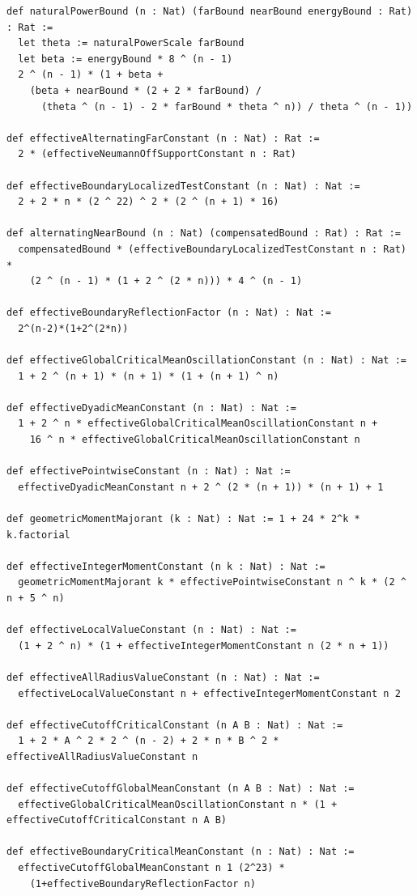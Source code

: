 \documentclass[reqno,11pt]{amsart}
\numberwithin{equation}{section}
\theoremstyle{definition}
\theoremstyle{remark}
\begin{document}
\begin{lstlisting}
def naturalPowerBound (n : Nat) (farBound nearBound energyBound : Rat) : Rat :=
  let theta := naturalPowerScale farBound
  let beta := energyBound * 8 ^ (n - 1)
  2 ^ (n - 1) * (1 + beta +
    (beta + nearBound * (2 + 2 * farBound) /
      (theta ^ (n - 1) - 2 * farBound * theta ^ n)) / theta ^ (n - 1))

def effectiveAlternatingFarConstant (n : Nat) : Rat :=
  2 * (effectiveNeumannOffSupportConstant n : Rat)

def effectiveBoundaryLocalizedTestConstant (n : Nat) : Nat :=
  2 + 2 * n * (2 ^ 22) ^ 2 * (2 ^ (n + 1) * 16)

def alternatingNearBound (n : Nat) (compensatedBound : Rat) : Rat :=
  compensatedBound * (effectiveBoundaryLocalizedTestConstant n : Rat) *
    (2 ^ (n - 1) * (1 + 2 ^ (2 * n))) * 4 ^ (n - 1)

def effectiveBoundaryReflectionFactor (n : Nat) : Nat :=
  2^(n-2)*(1+2^(2*n))

def effectiveGlobalCriticalMeanOscillationConstant (n : Nat) : Nat :=
  1 + 2 ^ (n + 1) * (n + 1) * (1 + (n + 1) ^ n)

def effectiveDyadicMeanConstant (n : Nat) : Nat :=
  1 + 2 ^ n * effectiveGlobalCriticalMeanOscillationConstant n +
    16 ^ n * effectiveGlobalCriticalMeanOscillationConstant n

def effectivePointwiseConstant (n : Nat) : Nat :=
  effectiveDyadicMeanConstant n + 2 ^ (2 * (n + 1)) * (n + 1) + 1

def geometricMomentMajorant (k : Nat) : Nat := 1 + 24 * 2^k * k.factorial

def effectiveIntegerMomentConstant (n k : Nat) : Nat :=
  geometricMomentMajorant k * effectivePointwiseConstant n ^ k * (2 ^ n + 5 ^ n)

def effectiveLocalValueConstant (n : Nat) : Nat :=
  (1 + 2 ^ n) * (1 + effectiveIntegerMomentConstant n (2 * n + 1))

def effectiveAllRadiusValueConstant (n : Nat) : Nat :=
  effectiveLocalValueConstant n + effectiveIntegerMomentConstant n 2

def effectiveCutoffCriticalConstant (n A B : Nat) : Nat :=
  1 + 2 * A ^ 2 * 2 ^ (n - 2) + 2 * n * B ^ 2 * effectiveAllRadiusValueConstant n

def effectiveCutoffGlobalMeanConstant (n A B : Nat) : Nat :=
  effectiveGlobalCriticalMeanOscillationConstant n * (1 + effectiveCutoffCriticalConstant n A B)

def effectiveBoundaryCriticalMeanConstant (n : Nat) : Nat :=
  effectiveCutoffGlobalMeanConstant n 1 (2^23) *
    (1+effectiveBoundaryReflectionFactor n)


\end{lstlisting}
\end{document}
